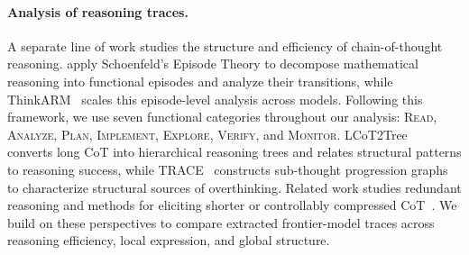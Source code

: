 \documentclass[10pt,letterpaper]{article}
\newcommand{\jane}[1]{}
\newcommand{\jb}[1]{}
\begin{document}
\paragraph{Analysis of reasoning traces.}
A separate line of work studies the structure and efficiency of chain-of-thought reasoning.
\citet{li-etal-2025-understanding} apply Schoenfeld's Episode Theory to decompose mathematical reasoning into functional episodes and analyze their transitions, while ThinkARM~\citep{li-etal-2026-schoenfelds} scales this episode-level analysis across models.
Following this framework, we use seven functional categories throughout our analysis:
\textsc{Read}, \textsc{Analyze}, \textsc{Plan}, \textsc{Implement},
\textsc{Explore}, \textsc{Verify}, and \textsc{Monitor}.
LCoT2Tree~\citep{jiang-etal-2025-makes} converts long CoT into hierarchical reasoning trees and relates structural patterns to reasoning success, while TRACE~\citep{zhang-etal-2026-llms-really} constructs sub-thought progression graphs to characterize structural sources of overthinking.
Related work studies redundant reasoning and methods for eliciting shorter or controllably compressed CoT~\citep{chen2024not,munkhbat-etal-2025-self,xia2025tokenskip}.
We build on these perspectives to compare extracted frontier-model traces across reasoning efficiency, local expression, and global structure.


\end{document}
